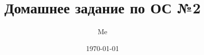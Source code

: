 \documentclass[12pt,a4paper,oneside]{article}
\title{Домашнее задание по ОС №2}
\author{Me}
\date{\today}
\begin{document}
  \sloppy
  \maketitle
  \tableofcontents
  \clearpage

  
  
\end{document}
